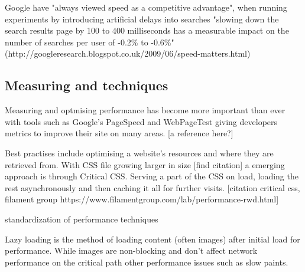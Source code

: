 Google have "always viewed speed as a competitive advantage", when running experiments by introducing artificial delays into searches "slowing down the search results page by 100 to 400 milliseconds has a measurable impact on the number of searches per user of -0.2\% to -0.6\%" (http://googleresearch.blogspot.co.uk/2009/06/speed-matters.html)

\subsection{Measuring and techniques} \label{l-r--measuring-and-techniques}

Measuring and optmising performance has become more important than ever with tools such as Google's PageSpeed and WebPageTest giving developers metrics to improve their site on many areas. [a reference here?]

Best practises include optimising a website's resources and where they are retrieved from. With CSS file growing larger in size [find citation] a emerging approach is through Critical CSS. Serving a part of the CSS on load, loading the rest asynchronously and then caching it all for further visits. [citation critical css, filament group https://www.filamentgroup.com/lab/performance-rwd.html]




standardization of performance techniques

Lazy loading is the method of loading content (often images) after initial load for performance. While images are non-blocking and don't affect network performance on the critical path other performance issues such as slow paints. %

